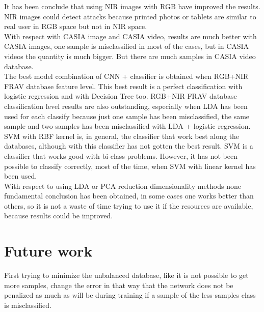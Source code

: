 It has been conclude that using NIR images with RGB have improved the results. NIR images could detect attacks because printed photos or tablets are similar to real user in RGB space but not in NIR space.\\

With respect with CASIA image and CASIA video, results are much better with CASIA images, one sample is misclassified in most of the cases, but in CASIA videos the quantity is much bigger. But there are much samples in CASIA video database.\\

The best model combination of CNN + classifier is obtained when RGB+NIR FRAV database feature level. This best result is a perfect classification with logistic regression and with Decision Tree too. RGB+NIR FRAV database classification level results are also outstanding, especially when LDA has been used for each classify because just one sample has been misclassified, the same sample and two samples has been misclassified with LDA + logistic regression.\\

SVM with RBF kernel is, in general, the classifier that work best along the databases, although with this classifier has not gotten the best result. SVM is a classifier that works good with bi-class problems. However, it has not been possible to classify correctly, most of the time, when SVM with linear kernel has been used.\\

With respect to using LDA or PCA reduction dimensionality methods none fundamental conclusion has been obtained, in some cases one works better than others, so it is not a waste of time trying to use it if the resources are available, because results could be improved.\\


\section{Future work}
First trying to minimize the unbalanced database, like it is not possible to get more samples, change the error in that way that the network does not be penalized as much as will be during training if a sample of the less-samples class  is misclassified.\\

